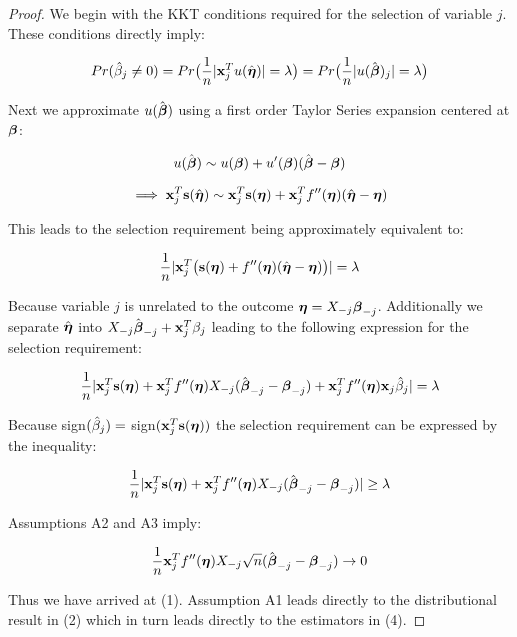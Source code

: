 \begin{proof}

We begin with the KKT conditions required for the selection of variable $j$.  These conditions directly imply:

\begin{equation*}
Pr(\hat{\beta}_j \neq 0)  = Pr\big(\frac{1}{n}|\mathbf{x}_{j}^T u(\hat{\boldsymbol{\eta}})| = \lambda\big)  = Pr\big(\frac{1}{n}|u(\hat{\boldsymbol{\beta}})_j| = \lambda\big)
\end{equation*}

Next we approximate $u(\hat{\boldsymbol{\beta}})$ using a first order Taylor Series expansion centered at $\boldsymbol{\beta}$:

\begin{equation*}
u(\hat{\boldsymbol{\beta}}) \sim u(\boldsymbol{\beta}) + u'(\boldsymbol{\beta})( \hat{\boldsymbol{\beta}} - \boldsymbol{\beta}) 
\end{equation*}

\begin{equation*}
\implies \mathbf{x}_j^T \mathbf{s}(\hat{\boldsymbol{\eta}}) \sim \mathbf{x}_j^T \mathbf{s}(\boldsymbol{\eta}) +  \mathbf{x}_j^T f''(\boldsymbol{\eta}) ( \hat{\boldsymbol{\eta}} - \boldsymbol{\eta})
\end{equation*}

This leads to the selection requirement being approximately equivalent to:

\begin{equation*}
\frac{1}{n}|\mathbf{x}_j^T \big( \mathbf{s}(\boldsymbol{\eta}) + f''(\boldsymbol{\eta}) (\hat{\boldsymbol{\eta}} - \boldsymbol{\eta})  \big) | = \lambda
\end{equation*}

Because variable $j$ is unrelated to the outcome $\boldsymbol{\eta}= X_{-j}\boldsymbol{\beta}_{-j}$.  Additionally we separate $\hat{\boldsymbol{\eta}}$ into $X_{-j}\hat{\boldsymbol{\beta}}_{-j} + \mathbf{x}_j^T\beta_j$ leading to the following expression for the selection requirement:

\begin{equation*}
\frac{1}{n}|\mathbf{x}_j^T \mathbf{s}(\boldsymbol{\eta}) + \mathbf{x}_j^T f''(\boldsymbol{\eta})X_{-j}(\hat{\boldsymbol{\beta}}_{-j} -  \boldsymbol{\beta}_{-j}) + \mathbf{x}_j^T f''(\boldsymbol{\eta})\mathbf{x}_j \hat{\beta}_j |  = \lambda
\end{equation*}

Because sign$(\hat{\beta}_j) =$ sign$(\mathbf{x}_j^T \mathbf{s}(\boldsymbol{\eta}))$ the selection requirement can be expressed by the inequality:

\begin{equation*}
\frac{1}{n}|\mathbf{x}_j^T  \mathbf{s}(\boldsymbol{\eta}) + \mathbf{x}_j^T f''(\boldsymbol{\eta})X_{-j}(\hat{\boldsymbol{\beta}}_{-j} -  \boldsymbol{\beta}_{-j}) |  \geq \lambda
\end{equation*}

Assumptions A2 and A3 imply:

\begin{equation*}
\frac{1}{n}\mathbf{x}_j^T f''(\boldsymbol{\eta})X_{-j}\sqrt{n}(\hat{\boldsymbol{\beta}}_{-j} -  \boldsymbol{\beta}_{-j})  \rightarrow 0
\end{equation*}

Thus we have arrived at (1).  Assumption A1 leads directly to the distributional result in (2) which in turn leads directly to the estimators in (4).\qedhere

\end{proof}
  
